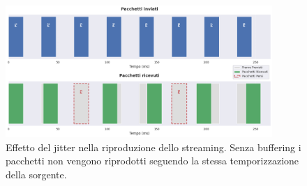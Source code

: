 \begin{figure}[htbp]
    \centering
    \includegraphics[width=0.9\textwidth]{figures/jitter.png}
    \caption{Effetto del jitter nella riproduzione dello streaming. Senza buffering i pacchetti non vengono riprodotti seguendo la stessa temporizzazione della sorgente.}
    \label{fig:jitter}
\end{figure}

